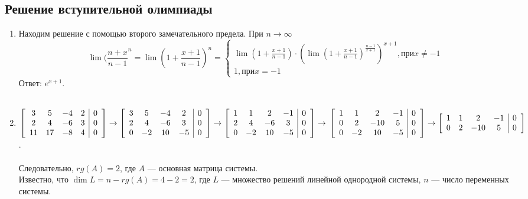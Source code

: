 \documentclass[pdftex,12pt,a4paper]{article}
\begin{document}
\subsection{Решение вступительной олимпиады}
\begin{enumerate}
\item Находим решение с помощью второго замечательного предела. При $n \to \infty$
\begin{equation}
\lim(\frac{n+x}{n-1}^n=\lim (1+\frac{x+1}{n-1})^n=\begin{cases}
\lim (1+\frac{x+1}{n-1})\cdot \left(\lim(1+\frac{x+1}{n-1})^{\frac{n-1}{x+1}}\right)^{x+1},   \text{при} x\ne -1  \\
1, \text{при} x=-1
\end{cases}
\end{equation}
Ответ: $e^{x+1}$.\\\\
\item 
$\left[ \begin{array}{cccc|c}
3 & 5 & -4 & 2 & 0\\
2 & 4 & -6 & 3 & 0\\
11 & 17 & -8 & 4 & 0
\end{array}\right] \to
\left[ \begin{array}{cccc|c}
3 & 5 & -4 & 2 & 0\\
2 & 4 & -6 & 3 & 0\\
0 & -2 & 10 & -5 & 0
\end{array}\right] \to
\left[ \begin{array}{cccc|c}
1 & 1 & 2 & -1 & 0\\
2 & 4 & -6 & 3 & 0\\
0 & -2 & 10 & -5 & 0
\end{array}\right] \to\\\\
\left[ \begin{array}{cccc|c}
1 & 1 & 2 & -1 & 0\\
0 & 2 & -10 & 5 & 0\\
0 & -2 & 10 & -5 & 0
\end{array}\right] \to
\left[ \begin{array}{cccc|c}
1 & 1 & 2 & -1 & 0\\
0 & 2 & -10 & 5 & 0
\end{array}\right]$.\\\\
Следовательно, $rg(A)=2$, где $A$ --- основная матрица системы.\\
 Известно, что $\dim L=n-rg(A)=4-2=2$, где $L$ --- множество решений линейной однородной системы, $n$ --- число переменных системы.\\

\end{enumerate}
\end{document}
